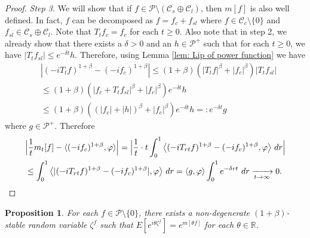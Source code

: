 \documentclass[12pt,a4paper]{amsart}
\theoremstyle{plain}
\newtheorem{prop}[thm]{Proposition}
\theoremstyle{definition}
\numberwithin{equation}{section}
\begin{document}
\begin{proof}
  \emph{Step 3.} We will show that if $f\in \mathcal P \setminus (\mathcal C_s \oplus \mathcal C_l)$, then $m[f]$ is also well defined. 
  In fact, $f$ can be decomposed as $f = f_c + f_{sl}$ where $f \in \mathcal C_c\setminus \{0\}$ and $f_{sl}\in \mathcal C_s \oplus \mathcal C_l$. 
  Note that $T_t f_c = f_c$ for each $t\geq 0$. 
  Also note that in step 2, we already show that there exists a $\delta > 0$ and an $h \in \mathcal P^+$ such that for each $t\geq 0$, we have $|T_t f_{sl}| \leq e^{- \delta t}h$.
  Therefore, using Lemma \ref{lem: Lip of power function} we have 
\begin{align}
  &|(-iT_t f)^{1+\beta} - (-i f_c)^{1+\beta}|
  \leq (1+\beta) ( |T_tf|^\beta + |f_c|^\beta) |T_tf_{sl}|
  \\&\leq (1+\beta) ( |f_c + T_t f_{sl}|^\beta + |f_c|^\beta) e^{- \delta t} h
  \\&\leq (1+\beta) ( (|f_c| + |h|)^\beta + |f_c|^\beta) e^{- \delta t} h
  =: e^{- \delta t} g
\end{align}
where $g\in \mathcal P^+$.
Therefore 
\begin{align}
  \label{eq:P:S:1}
  &\Big| \frac{1}{t} m_t[f] - \langle (-if_c)^{1+\beta}, \varphi\rangle\Big|
  = \Big| \frac{1}{t} \cdot t \int_0^1  \big\langle (-iT_{rt}f)^{1+\beta} - (-if_c)^{1+\beta}, \varphi\big \rangle ~dr \Big|\\
  &\leq \int_0^1  \big\langle |(-iT_{rt}f)^{1+\beta} - (-if_c)^{1+\beta}|, \varphi\big \rangle ~dr = \langle g,\varphi\rangle\int_0^1 e^{-\delta rt} ~dr
    \xrightarrow[t\to \infty]{} 0.
    \qedhere
\end{align}
\end{proof}

\begin{prop}
  \label{prop:PL:S}
  For each $f \in \mathcal P\setminus \{0\}$, there exists a non-degenerate $(1+\beta)$-stable random variable $\zeta^f$ such that 
\(
  E[e^{i\theta\zeta^f}] = e^{m[\theta f]}
\)
for each $\theta \in \mathbb R$.
\end{prop}
\end{document}
